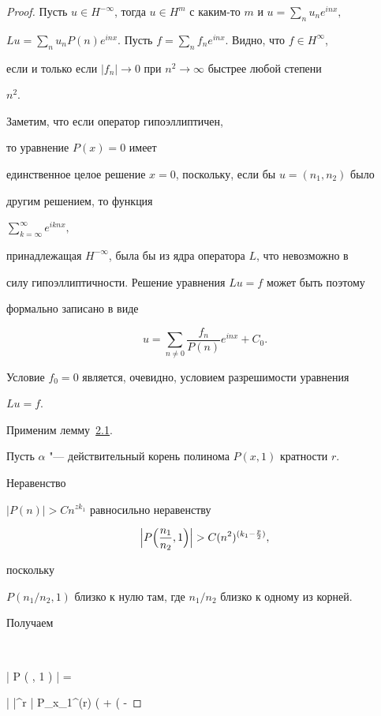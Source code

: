 \begin{proof}

 Пусть $u \in H^{- \infty}$, тогда $u \in H^m$ с каким-то $m$ и $u = \sum_n u_n e^{i n x},$ 

 $ L u = \sum_n u_n P (n) e^{i n x}$. Пусть $f = \sum_n f_n e^{i n x}$. Видно, что $f \in H^\infty$,

если и только если $|f_n| \to 0$ при $n^2 \to \infty$ быстрее любой степени

$n^2$. 

Заметим, что если оператор гипоэллиптичен,

то уравнение $P (x) = 0$ имеет

единственное целое решение $x = 0$, поскольку, если бы $u = (n_1, n_2)$ было

другим решением, то функция 

$\sum^\infty_{k = \infty} e^{i k n x},$

принадлежащая $H^{- \infty}$, была бы из ядра оператора $L$, что невозможно в

силу гипоэллиптичности. Решение уравнения $L u = f$ может быть поэтому

формально записано в виде 

$$u = \sum_{n \not= 0} \frac {f_n}{ P (n)} e^{i n x}

+ C_0.$$ 



Условие $f_0 = 0$ является, очевидно, условием разрешимости уравнения

${L u = f}$. 

Применим лемму~\hyperlink{bur:lemma:2.1}{2.1}. 

Пусть $\alpha$ "--- действительный корень полинома $P(x, 1)$ кратности $r$. 

Неравенство

$|P(n)| > C n^{z k_1}$ равносильно неравенству 

$$

\Bigl | P \Bigl ( \frac {n_1}{n_2}, 1 \Bigr ) \Bigr | > C (n^2)^{(k_1 - \frac p2)},

$$ 

поскольку

$P ( {n_1}/{n_2}, 1 )$ близко к нулю там, где ${n_1}/{n_2}$ близко к одному из корней. 

Получаем 

$$

\Bigl | P \Bigl ( , 1 \Bigr ) \Bigr | = 

\Bigl |  \alpha \Bigr |^r \cdot \Bigl | P_{x_1}^{(r)} \Bigl (  + \tau \Bigl ( \alpha - \frac


\end{proof}
